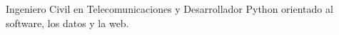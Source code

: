 Ingeniero Civil en Telecomunicaciones y Desarrollador Python orientado al software, los datos y la web.